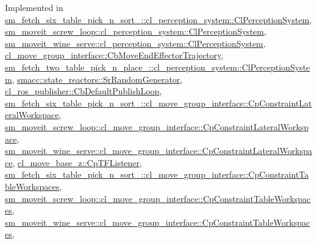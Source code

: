 Implemented in \hyperlink{classsm__fetch__six__table__pick__n__sort__1_1_1cl__perception__system_1_1ClPerceptionSystem_a87292907b7b771d19d91c6de47ea8d1d}{sm\+\_\+fetch\+\_\+six\+\_\+table\+\_\+pick\+\_\+n\+\_\+sort\+\_\+::cl\+\_\+perception\+\_\+system\+::\+Cl\+Perception\+System}, \hyperlink{classsm__moveit__screw__loop_1_1cl__perception__system_1_1ClPerceptionSystem_a171e1bf0334b2eb957792ecb3ad11b7a}{sm\+\_\+moveit\+\_\+screw\+\_\+loop\+::cl\+\_\+perception\+\_\+system\+::\+Cl\+Perception\+System}, \hyperlink{classsm__moveit__wine__serve_1_1cl__perception__system_1_1ClPerceptionSystem_ac0bee71483d666f6179f243724c3b4a5}{sm\+\_\+moveit\+\_\+wine\+\_\+serve\+::cl\+\_\+perception\+\_\+system\+::\+Cl\+Perception\+System}, \hyperlink{classcl__move__group__interface_1_1CbMoveEndEffectorTrajectory_a57fedb6a0603fe569842a13faf19f5cd}{cl\+\_\+move\+\_\+group\+\_\+interface\+::\+Cb\+Move\+End\+Effector\+Trajectory}, \hyperlink{classsm__fetch__two__table__pick__n__place__1_1_1cl__perception__system_1_1ClPerceptionSystem_ac6e10d6fc38d2b1d561875298307c235}{sm\+\_\+fetch\+\_\+two\+\_\+table\+\_\+pick\+\_\+n\+\_\+place\+\_\+::cl\+\_\+perception\+\_\+system\+::\+Cl\+Perception\+System}, \hyperlink{classsmacc_1_1state__reactors_1_1SrRandomGenerator_adf6e20208210f30639b92214e1dda83b}{smacc\+::state\+\_\+reactors\+::\+Sr\+Random\+Generator}, \hyperlink{classcl__ros__publisher_1_1CbDefaultPublishLoop_aef241d1976f0105643976545880d5e21}{cl\+\_\+ros\+\_\+publisher\+::\+Cb\+Default\+Publish\+Loop}, \hyperlink{classsm__fetch__six__table__pick__n__sort__1_1_1cl__move__group__interface_1_1CpConstraintLateralWorkspace_ac2b93d99ca5fb46aabfa98040124b272}{sm\+\_\+fetch\+\_\+six\+\_\+table\+\_\+pick\+\_\+n\+\_\+sort\+\_\+::cl\+\_\+move\+\_\+group\+\_\+interface\+::\+Cp\+Constraint\+Lateral\+Workspace}, \hyperlink{classsm__moveit__screw__loop_1_1cl__move__group__interface_1_1CpConstraintLateralWorkspace_a2c742726dc5d521fba7a357dc4ec3dac}{sm\+\_\+moveit\+\_\+screw\+\_\+loop\+::cl\+\_\+move\+\_\+group\+\_\+interface\+::\+Cp\+Constraint\+Lateral\+Workspace}, \hyperlink{classsm__moveit__wine__serve_1_1cl__move__group__interface_1_1CpConstraintLateralWorkspace_a76692ba49429efb9e704cd8fdcf6ec0b}{sm\+\_\+moveit\+\_\+wine\+\_\+serve\+::cl\+\_\+move\+\_\+group\+\_\+interface\+::\+Cp\+Constraint\+Lateral\+Workspace}, \hyperlink{classcl__move__base__z_1_1CpTFListener_a0bdf03c329aab2ea038b67e51996a515}{cl\+\_\+move\+\_\+base\+\_\+z\+::\+Cp\+T\+F\+Listener}, \hyperlink{classsm__fetch__six__table__pick__n__sort__1_1_1cl__move__group__interface_1_1CpConstraintTableWorkspaces_ac938a2faf9dc7e9cc1f24bac150f189f}{sm\+\_\+fetch\+\_\+six\+\_\+table\+\_\+pick\+\_\+n\+\_\+sort\+\_\+::cl\+\_\+move\+\_\+group\+\_\+interface\+::\+Cp\+Constraint\+Table\+Workspaces}, \hyperlink{classsm__moveit__screw__loop_1_1cl__move__group__interface_1_1CpConstraintTableWorkspaces_a873050debbad5977c78beb93a0b6ce77}{sm\+\_\+moveit\+\_\+screw\+\_\+loop\+::cl\+\_\+move\+\_\+group\+\_\+interface\+::\+Cp\+Constraint\+Table\+Workspaces}, \hyperlink{classsm__moveit__wine__serve_1_1cl__move__group__interface_1_1CpConstraintTableWorkspaces_af14a8a8c61b0dcfa6b062ba8493d5a5d}{sm\+\_\+moveit\+\_\+wine\+\_\+serve\+::cl\+\_\+move\+\_\+group\+\_\+interface\+::\+Cp\+Constraint\+Table\+Workspaces}, 